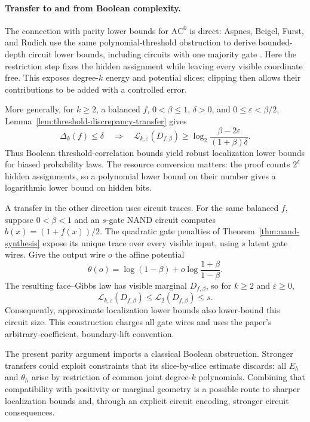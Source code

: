 \documentclass{article}
\newcommand{\LC}{\mathcal{L}}
\begin{document}
\paragraph{Transfer to and from Boolean complexity.}
\label{par:boolean-transfers}
The connection with parity lower bounds for $\mathrm{AC}^0$ is direct:
Aspnes, Beigel, Furst, and Rudich use the same polynomial-threshold obstruction
to derive bounded-depth circuit lower bounds, including circuits with one
majority gate \cite[Section~5]{abfr94}.  Here the restriction step fixes the
hidden assignment while leaving every visible coordinate free.  This exposes
degree-$k$ energy and potential slices; clipping then allows their contributions
to be added with a controlled error.

More generally, for $k\ge2$, a balanced $f$, $0<\beta\le1$, $\delta>0$, and
$0\le\varepsilon<\beta/2$, Lemma~\ref{lem:threshold-discrepancy-transfer} gives
\[
 \Delta_k(f)\le\delta
 \quad\Longrightarrow\quad
 \LC_{k,\varepsilon}(D_{f,\beta})
 \ge \log_2\frac{\beta-2\varepsilon}{(1+\beta)\delta}.
\]
Thus Boolean threshold-correlation bounds yield robust localization lower
bounds for biased probability laws.  The resource conversion matters:
the proof counts $2^\ell$ hidden assignments, so a polynomial lower bound
on their number gives a logarithmic lower bound on hidden bits.

A transfer in the other direction uses circuit traces.  For the same balanced
$f$, suppose $0<\beta<1$ and an $s$-gate NAND circuit computes
$b(x)=(1+f(x))/2$.
The quadratic gate penalties of Theorem~\ref{thm:nand-synthesis} expose its
unique trace over every visible input, using $s$ latent gate wires.
Give the output wire $o$ the affine potential
\[
 \theta(o)=\log(1-\beta)
   +o\log\frac{1+\beta}{1-\beta}.
\]
The resulting face--Gibbs law has visible marginal $D_{f,\beta}$, so for
$k\ge2$ and $\varepsilon\ge0$,
\[
 \LC_{k,\varepsilon}(D_{f,\beta})
 \le \LC_2(D_{f,\beta})\le s.
\]
Consequently, approximate localization lower bounds also lower-bound this
circuit size.  This construction charges all gate wires and uses the paper's
arbitrary-coefficient, boundary-lift convention.

The present parity argument imports a classical Boolean obstruction.
Stronger transfers could exploit constraints that its slice-by-slice estimate
discards: all $E_h$ and $\theta_h$ arise by restriction of common joint
degree-$k$ polynomials.  Combining that compatibility with positivity or
marginal geometry is a possible route to sharper localization bounds and,
through an explicit circuit encoding, stronger circuit consequences.
\end{document}
